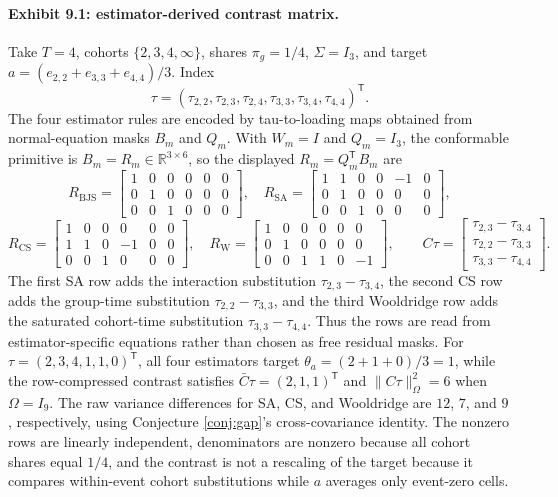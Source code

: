 \documentclass[11pt]{article}
\newcommand{\transpose}{\mathsf{T}}
\newcommand{\R}{\mathbb{R}}
\theoremstyle{definition}
\theoremstyle{plain}
\theoremstyle{remark}
\begin{document}
\paragraph{Exhibit 9.1: estimator-derived contrast matrix.}
Take \(T=4\), cohorts \(\{2,3,4,\infty\}\), shares \(\pi_g=1/4\), \(\Sigma=I_3\),
and target \(a=(e_{2,2}+e_{3,3}+e_{4,4})/3\). Index
\[
\tau=(\tau_{2,2},\tau_{2,3},\tau_{2,4},\tau_{3,3},\tau_{3,4},\tau_{4,4})^\transpose .
\]
The four estimator rules are encoded by tau-to-loading maps obtained from
normal-equation masks \(B_m\) and \(Q_m\). With \(W_m=I\) and
\(Q_m=I_3\), the conformable primitive is \(B_m=R_m\in\R^{3\times 6}\), so
the displayed \(R_m=Q_m^\transpose B_m\) are
\[
R_{\mathrm{BJS}}=
\begin{bmatrix}1&0&0&0&0&0\\0&1&0&0&0&0\\0&0&1&0&0&0\end{bmatrix},
\quad
R_{\mathrm{SA}}=
\begin{bmatrix}
1&1&0&0&-1&0\\
0&1&0&0&0&0\\
0&0&1&0&0&0
\end{bmatrix},
\]
\[
R_{\mathrm{CS}}=
\begin{bmatrix}
1&0&0&0&0&0\\
1&1&0&-1&0&0\\
0&0&1&0&0&0
\end{bmatrix},
\quad
R_{\mathrm{W}}=
\begin{bmatrix}
1&0&0&0&0&0\\
0&1&0&0&0&0\\
0&0&1&1&0&-1
\end{bmatrix},\qquad
C\tau=
\begin{bmatrix}
\tau_{2,3}-\tau_{3,4}\\
\tau_{2,2}-\tau_{3,3}\\
\tau_{3,3}-\tau_{4,4}
\end{bmatrix}.
\]
The first SA row adds the interaction substitution
\(\tau_{2,3}-\tau_{3,4}\), the second CS row adds the group-time substitution
\(\tau_{2,2}-\tau_{3,3}\), and the third Wooldridge row adds the saturated
cohort-time substitution \(\tau_{3,3}-\tau_{4,4}\). Thus the rows are read from
estimator-specific equations rather than chosen as free residual masks.
For \(\tau=(2,3,4,1,1,0)^\transpose\), all four estimators target
\(\theta_a=(2+1+0)/3=1\), while the row-compressed contrast satisfies
\(\bar C\tau=(2,1,1)^\transpose\) and \(\|C\tau\|^2_{\Omega}=6\) when
\(\Omega=I_9\). The raw variance differences for SA, CS, and Wooldridge are
\(12\), \(7\), and \(9\), respectively, using Conjecture \ref{conj:gap}'s
cross-covariance identity. The nonzero rows are linearly
independent, denominators are nonzero because all cohort shares equal \(1/4\),
and the contrast is not a rescaling of the target because it compares
within-event cohort substitutions while \(a\) averages only event-zero cells.
\end{document}
